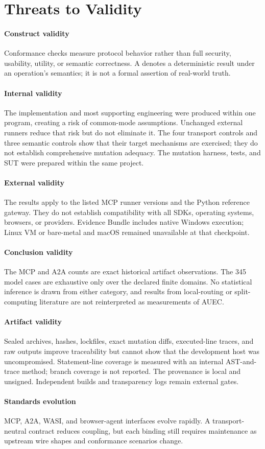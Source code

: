 \section{Threats to Validity}
\label{sec:validity}

\paragraph{Construct validity}
Conformance checks measure protocol behavior rather than full security, usability, utility, or semantic correctness. A \factkind{} denotes a deterministic result under an operation's semantics; it is not a formal assertion of real-world truth.

\paragraph{Internal validity}
The implementation and most supporting engineering were produced within one program, creating a risk of common-mode assumptions. Unchanged external runners reduce that risk but do not eliminate it. The four transport controls and three semantic controls show that their target mechanisms are exercised; they do not establish comprehensive mutation adequacy. The mutation harness, tests, and SUT were prepared within the same project.

\paragraph{External validity}
The results apply to the listed MCP runner versions and the Python reference gateway. They do not establish compatibility with all SDKs, operating systems, browsers, or providers. Evidence Bundle \evidenceid{} includes native Windows execution; Linux VM or bare-metal and macOS remained unavailable at that checkpoint.

\paragraph{Conclusion validity}
The MCP and A2A counts are exact historical artifact observations. The 345 model cases are exhaustive only over the declared finite domains. No statistical inference is drawn from either category, and results from local-routing or split-computing literature are not reinterpreted as measurements of AUEC.

\paragraph{Artifact validity}
Sealed archives, hashes, lockfiles, exact mutation diffs, executed-line traces, and raw outputs improve traceability but cannot show that the development host was uncompromised. Statement-line coverage is measured with an internal AST-and-trace method; branch coverage is not reported. The provenance is local and unsigned. Independent builds and transparency logs remain external gates.

\paragraph{Standards evolution}
MCP, A2A, WASI, and browser-agent interfaces evolve rapidly. A transport-neutral contract reduces coupling, but each binding still requires maintenance as upstream wire shapes and conformance scenarios change.
